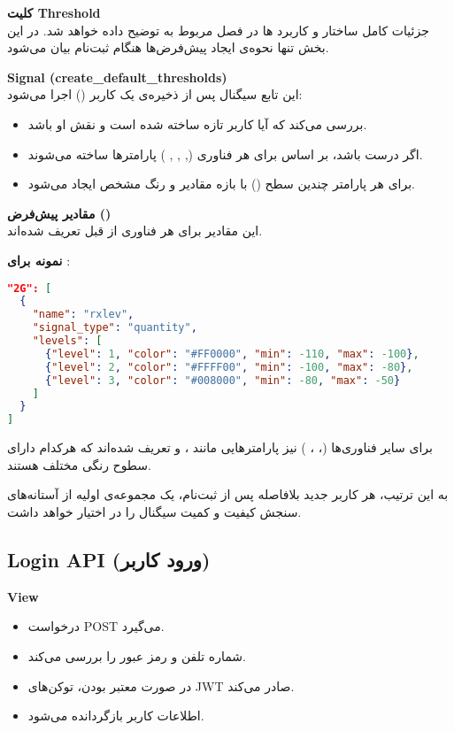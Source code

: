 \documentclass{report}
\begin{document}
\textbf{کلیت Threshold} \\
جزئیات کامل ساختار و کاربرد ها در فصل مربوط به  توضیح داده خواهد شد. 
در این بخش تنها نحوه‌ی ایجاد پیش‌فرض‌ها هنگام ثبت‌نام بیان می‌شود.

\textbf{Signal (create\_default\_thresholds)} \\
این تابع سیگنال پس از ذخیره‌ی یک کاربر () اجرا می‌شود:
\begin{itemize}
  \item بررسی می‌کند که آیا کاربر تازه ساخته شده است و نقش او  باشد.
  \item اگر درست باشد، بر اساس  برای هر فناوری (, , , ) پارامترها ساخته می‌شوند.
  \item برای هر پارامتر چندین سطح () با بازه مقادیر و رنگ مشخص ایجاد می‌شود.
\end{itemize}



\textbf{مقادیر پیش‌فرض ()} \\
این مقادیر برای هر فناوری از قبل تعریف شده‌اند.

\textbf{نمونه برای }:
\begin{lstlisting}[language=json]
"2G": [
  {
    "name": "rxlev",
    "signal_type": "quantity",
    "levels": [
      {"level": 1, "color": "#FF0000", "min": -110, "max": -100},
      {"level": 2, "color": "#FFFF00", "min": -100, "max": -80},
      {"level": 3, "color": "#008000", "min": -80, "max": -50}
    ]
  }
]
\end{lstlisting}

برای سایر فناوری‌ها (، ، ) نیز پارامترهایی مانند ،  و  تعریف شده‌اند که هرکدام دارای سطوح رنگی مختلف هستند. 

به این ترتیب، هر کاربر جدید بلافاصله پس از ثبت‌نام، یک مجموعه‌ی اولیه از آستانه‌های سنجش کیفیت و کمیت سیگنال را در اختیار خواهد داشت.



\subsection{Login API (ورود کاربر)}
\textbf{View } \\
\begin{itemize}
  \item درخواست POST می‌گیرد.
  \item شماره تلفن و رمز عبور را بررسی می‌کند.
  \item در صورت معتبر بودن، توکن‌های JWT صادر می‌کند.
  \item اطلاعات کاربر بازگردانده می‌شود.
\end{itemize}
\end{document}
